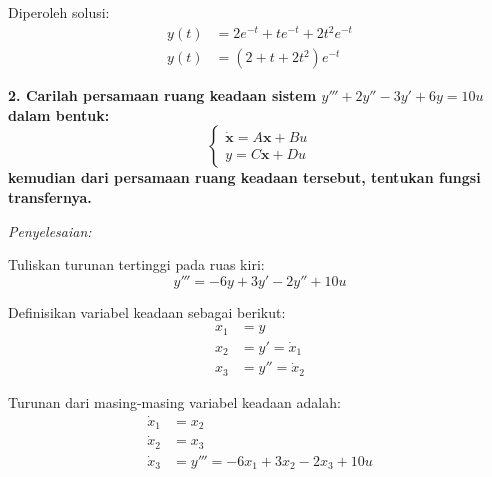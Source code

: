 \documentclass[11pt,a4paper]{article}
\begin{document}
Diperoleh solusi:
\begin{align*}
    y(t) &= 2e^{-t} + t e^{-t} + 2t^2 e^{-t} \\
    y(t) &= (2 + t + 2t^2) e^{-t}
\end{align*}

\vspace{18pt}

\setcounter{equation}{0}
\noindent \textbf{2. Carilah persamaan ruang keadaan sistem $y''' + 2y'' - 3y' + 6y = 10u$ dalam bentuk:}
\begin{equation*}
    \begin{cases}
        \mathbf{\dot{x}} = A\mathbf{x} + Bu \\
        y = C\mathbf{x} + Du
    \end{cases}
\end{equation*}
\textbf{kemudian dari persamaan ruang keadaan tersebut, tentukan fungsi transfernya.}

\vspace{2pt}
\noindent \textit{Penyelesaian:}

Tuliskan turunan tertinggi pada ruas kiri:
\begin{equation*}
    y''' = -6y + 3y' - 2y'' + 10u
\end{equation*}

Definisikan variabel keadaan sebagai berikut:
\begin{align*}
    x_1 &= y \\
    x_2 &= y' = \dot{x}_1 \\
    x_3 &= y'' = \dot{x}_2
\end{align*}

Turunan dari masing-masing variabel keadaan adalah:
\begin{align*}
    \dot{x}_1 &= x_2 \\
    \dot{x}_2 &= x_3 \\
    \dot{x}_3 &= y''' = -6x_1 + 3x_2 - 2x_3 + 10u
\end{align*}
\end{document}
